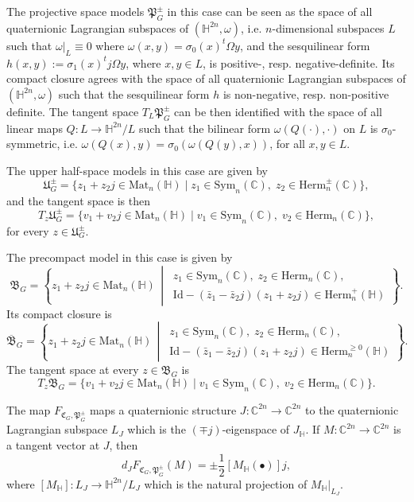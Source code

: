 \documentclass[oneside,11pt]{amsart}
\theoremstyle{definition}
\theoremstyle{remark}
\newcommand{\midwd}{\,\middle\vert\,}
\numberwithin{thm}{section}
\numberwithin{equation}{section}
\begin{document}
    The projective space models $\mathfrak{P}_G^\pm$ in this case can be seen as the space of all quaternionic Lagrangian subspaces of $(\mathbb H^{2n},\omega)$, i.e. $n$-dimensional subspaces $L$ such that $\omega|_L\equiv 0$ where $\omega (x,y)=\sigma_0(x)^t\Omega y$, and the sesquilinear form $h(x,y):=\sigma_1(x)^t j \Omega y$, where $x,y\in L$, is positive-, resp. negative-definite.  Its compact closure agrees with the space of all quaternionic Lagrangian subspaces of $(\mathbb H^{2n},\omega)$ such that the sesquilinear form $h$ is non-negative, resp. non-positive definite. The tangent space $T_L\mathfrak{P}_G^\pm$ can be then identified with the space of all linear maps $Q\colon L\to \mathbb{H}^{2n}/L$ such that the bilinear form $\omega(Q(\cdot),\cdot)$ on $L$ is $\sigma_0$-symmetric, i.e. $\omega(Q(x),y)=\sigma_0(\omega(Q(y),x))$, for all $x,y\in L$.

    The upper half-space models in this case are given by
    $$\mathfrak{U}_G^\pm=\{z_1+z_2j\in\mathrm{Mat}_n(\mathbb H)\mid z_1\in\mathrm{Sym}_n(\mathbb C),\;z_2\in\mathrm{Herm}^\pm_n(\mathbb C)\},$$
     and the tangent space is then 
     \[T_z\mathfrak{U}_G^\pm=\{v_1+v_2j\in\mathrm{Mat}_n(\mathbb H)\mid v_1\in\mathrm{Sym}_n(\mathbb C),\;v_2\in\mathrm{Herm}_n(\mathbb C)\},\] 
     for every $z\in\mathfrak{U}_G^\pm$.

    The precompact model in this case is given by
    $$\mathfrak{B}_G=\left\{z_1+z_2j\in\mathrm{Mat}_n(\mathbb H)\midwd \begin{array}{l}z_1\in\mathrm{Sym}_n(\mathbb C),\;z_2\in\mathrm{Herm}_n(\mathbb C),\\
    \mathrm{Id}-(\bar z_1-\bar z_2j)(z_1+z_2j)\in \mathrm{Herm}^+_n(\mathbb H)
    \end{array}\right\}.$$
    Its compact closure is
    $$\overline{\mathfrak{B}}_G=\left\{z_1+z_2j\in\mathrm{Mat}_n(\mathbb H)\midwd \begin{array}{l}z_1\in\mathrm{Sym}_n(\mathbb C),\;z_2\in\mathrm{Herm}_n(\mathbb C),\\
    \mathrm{Id}-(\bar z_1-\bar z_2j)(z_1+z_2j)\in \mathrm{Herm}^{\geq 0}_n(\mathbb H)\end{array}\right\}.$$
    The tangent space at every $z\in\mathfrak{B}_G$ is \[T_z\mathfrak{B}_G=\{v_1+v_2j\in\mathrm{Mat}_n(\mathbb H)\mid v_1\in\mathrm{Sym}_n(\mathbb C),\;v_2\in\mathrm{Herm}_n(\mathbb C)\}.\]


    The map $F_{\mathfrak{C}_G,\mathfrak{P}_G^\pm}$ maps a quaternionic structure $J\colon \mathbb C^{2n}\to \mathbb C^{2n}$ to the quaternionic Lagrangian subspace $L_J$ which is the $(\mp j)$-eigenspace of $J_\mathbb H$. If $M\colon \mathbb C^{2n}\to \mathbb C^{2n}$ is a tangent vector at $J$, then 
    \[d_JF_{\mathfrak{C}_G,\mathfrak{P}_G^\pm}(M)=\pm\frac{1}{2}[M_\mathbb H(\bullet)]j,\] 
    where $[M_\mathbb H]\colon L_J\to \mathbb H^{2n}/L_J$ which is the natural projection of $M_\mathbb H|_{L_J}$.
\end{document}
